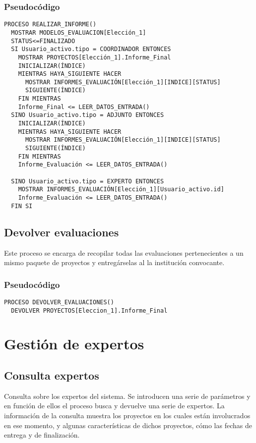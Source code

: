 \documentclass[12pt,a4paper,spanish,twoside]{book}
\begin{document}
\subsubsection{Pseudocódigo}
\begin{lstlisting}[inputencoding=utf8/latin1]
PROCESO REALIZAR_INFORME()
  MOSTRAR MODELOS_EVALUACION[Elección_1]
  STATUS<=FINALIZADO
  SI Usuario_activo.tipo = COORDINADOR ENTONCES
    MOSTRAR PROYECTOS[Elección_1].Informe_Final
    INICIALIZAR(ÍNDICE)
    MIENTRAS HAYA_SIGUIENTE HACER
      MOSTRAR INFORMES_EVALUACIÓN[Elección_1][INDICE][STATUS]
      SIGUIENTE(ÍNDICE)
    FIN MIENTRAS
    Informe_Final <= LEER_DATOS_ENTRADA()
  SINO Usuario_activo.tipo = ADJUNTO ENTONCES
    INICIALIZAR(ÍNDICE)
    MIENTRAS HAYA_SIGUIENTE HACER
      MOSTRAR INFORMES_EVALUACIÓN[Elección_1][INDICE][STATUS]
      SIGUIENTE(ÍNDICE)
    FIN MIENTRAS
    Informe_Evaluación <= LEER_DATOS_ENTRADA()

  SINO Usuario_activo.tipo = EXPERTO ENTONCES
    MOSTRAR INFORMES_EVALUACIÓN[Elección_1][Usuario_activo.id]
    Informe_Evaluación <= LEER_DATOS_ENTRADA()
  FIN SI
\end{lstlisting}

\subsection{Devolver evaluaciones}
Este proceso se encarga de recopilar todas las evaluaciones pertenecientes a un 
mismo paquete de proyectos y entregárselas al la institución convocante.

\subsubsection{Pseudocódigo}
\begin{lstlisting}[inputencoding=utf8/latin1]
PROCESO DEVOLVER_EVALUACIONES()
  DEVOLVER PROYECTOS[Eleccion_1].Informe_Final
\end{lstlisting}


\section{Gestión de expertos}

\subsection{Consulta expertos}
Consulta sobre los expertos del sistema. Se introducen una serie de parámetros y
en función de ellos el proceso busca y devuelve una serie de expertos. La 
información de la consulta muestra los proyectos en los cuales están 
involucrados en ese momento, y algunas características de dichos proyectos, cómo
las fechas de entrega y de finalización.
\end{document}
